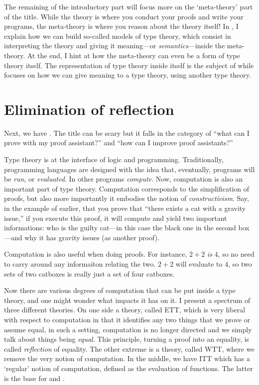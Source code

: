 The remaining of the introductory part will focus more on the `meta-theory'
part of the title. While the theory is where you conduct your proofs and write
your programs, the meta-theory is where you reason about the theory itself!
In , I explain how we can build so-called models of type theory,
which consist in interpreting the theory and giving it meaning---or
\emph{semantics}---inside the meta-theory. At the end, I hint at how the
meta-theory can even be a form of type theory itself. The representation of
type theory inside itself is the subject of  while
 focuses on how we can give meaning to a type theory, using
another type theory.

\section{Elimination of reflection}

Next, we have . The title can be scary but it falls in
the category of ``what can I prove with my proof assistant?'' and
``how can I improve proof assistants?''

Type theory is at the interface of logic and programming. Traditionally,
programming languages are designed with the idea that, eventually, programs
will be \emph{run}, or \emph{evaluated}. In other programs \emph{compute}.
Now, computation is also an important part of type theory. Computation
corresponds to the simplification of proofs, but also more importantly it
embodies the notion of \emph{constructivism}. Say, in the example of earlier,
that you prove that ``there exists a cat with a gravity issue,'' if you execute
this proof, it will compute and yield two important informations: who is the
guilty cat---in this case the black one in the second box---and why it has
gravity issues (as another proof).

Computation is also useful when doing proofs. For instance, \(2 + 2\) \emph{is}
\(4\), so no need to carry around any informaiton relating the two. \(2 + 2\)
will evaluate to \(4\), so two sets of two catboxes is really just a set of four
catboxes.

Now there are various degrees of computation that can be put inside a type
theory, and one might wonder what impacts it has on it. I present a spectrum
of three different theories. On one side a theory, called \acrfull{ETT},
which is very liberal with respect to computation in that it identifies any two
things that we prove or assume equal, in such a setting, computation is no
longer directed and we simply talk about things being \emph{equal}.
This principle, turning a proof into an equality, is called \emph{reflection} of
equality.
The other extreme is a theory, called \acrfull{WTT}, where we remove the very
notion of computation. In the middle, we have \acrfull{ITT} which has a
`regular' notion of computation, defined as the evaluation of functions. The
latter is the base for \Coq and \Agda.

